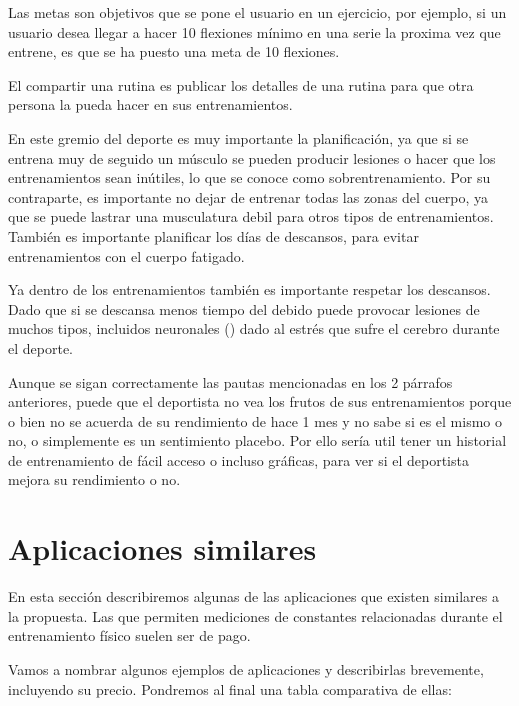 Las metas son objetivos que se pone el usuario en un ejercicio, por ejemplo, si un usuario desea llegar a hacer 10 flexiones mínimo en una serie la proxima vez que entrene, es que se ha puesto una meta de 10 flexiones.

El compartir una rutina es publicar los detalles de una rutina para que otra persona la pueda hacer en sus entrenamientos.

En este gremio del deporte es muy importante la planificación, ya que si se entrena muy de seguido un músculo se pueden producir lesiones o hacer que los entrenamientos sean inútiles, lo que se conoce como sobrentrenamiento. Por su contraparte, es importante no dejar de entrenar todas las zonas del cuerpo, ya que se puede lastrar una musculatura debil para otros tipos de entrenamientos. También es importante planificar los días de descansos, para evitar entrenamientos con el cuerpo fatigado. 

Ya dentro de los entrenamientos también es importante respetar los descansos. Dado que si se descansa menos tiempo del debido puede provocar lesiones de muchos tipos, incluidos neuronales (\cite{leonard2018impact}) dado al estrés que sufre el cerebro durante el deporte.

Aunque se sigan correctamente las pautas mencionadas en los 2 párrafos anteriores, puede que el deportista no vea los frutos de sus entrenamientos porque o bien no se acuerda de su rendimiento de hace 1 mes y no sabe si es el mismo o no, o simplemente es un sentimiento placebo. Por ello sería util tener un historial de entrenamiento de fácil acceso o incluso gráficas, para ver si el deportista mejora su rendimiento o no.

\section{Aplicaciones similares}

En esta sección describiremos algunas de las aplicaciones que existen similares a la propuesta. Las que permiten mediciones de constantes relacionadas durante el entrenamiento físico suelen ser de pago.

Vamos a nombrar algunos ejemplos de aplicaciones y describirlas brevemente, incluyendo su precio. Pondremos al final una tabla comparativa de ellas:

